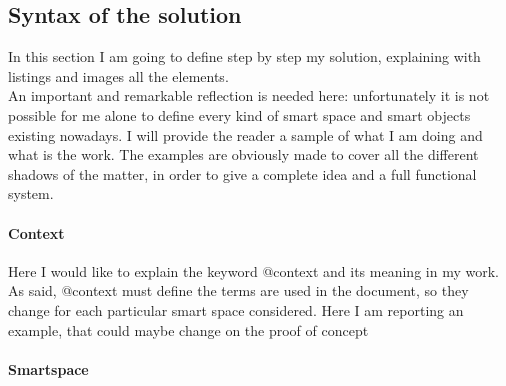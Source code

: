 \subsection{Syntax of the solution}
In this section I am going to define step by step my solution, explaining with listings and images all the elements. \\
An important and remarkable reflection is needed here: unfortunately it is not possible for me alone to define every kind of smart space and smart objects existing nowadays. I will provide the reader a sample of what I am doing and what is the work. The examples are obviously made to cover all the different shadows of the matter, in order to give a complete idea and a full functional system.

\paragraph{Context}
Here I would like to explain the keyword @context and its meaning in my work. As said, @context must define the terms are used in the document, so they change for each particular smart space considered. Here I am reporting an example, that could maybe change on the proof of concept 

\paragraph{Smartspace} 



%
